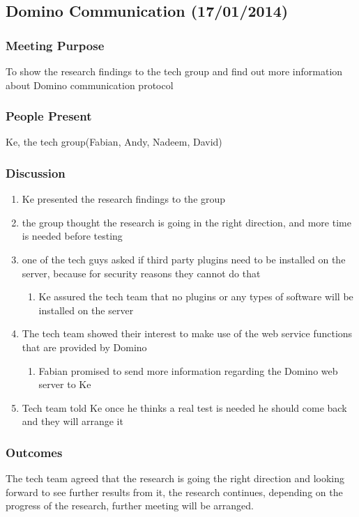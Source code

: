 \documentclass[12pt,a4paper,oneside,titlepage]{article}
\begin{document}
\subsection{Domino Communication (17/01/2014)}

\subsubsection{Meeting Purpose}
To show the research findings to the tech group and find out more information about Domino communication protocol

\subsubsection{People Present}
Ke, the tech group(Fabian, Andy, Nadeem, David)

\subsubsection{Discussion}
\begin{enumerate}
	\item Ke presented the research findings to the group 
	\item the group thought the research is going in the right direction, and more time is needed before testing 
	\item one of the tech guys asked if third party plugins need to be installed on the server, because for security reasons they cannot do that 
	\begin{enumerate}
		\item  Ke assured the tech team that no plugins or any types of software will be installed on the server 
	\end{enumerate}
	\item The tech team showed their interest to make use of the web service functions that are provided by Domino 
	\begin{enumerate}
		\item Fabian promised to send more information regarding the Domino web server to Ke 
	\end{enumerate}
	\item Tech team told Ke once he thinks a real test is needed he should come back and they will arrange it
\end{enumerate}

\subsubsection{Outcomes}
The tech team agreed that the research is going the right direction and looking forward to see further results from it, the research continues, depending on the progress of the research, further meeting will be arranged.
\end{document}
